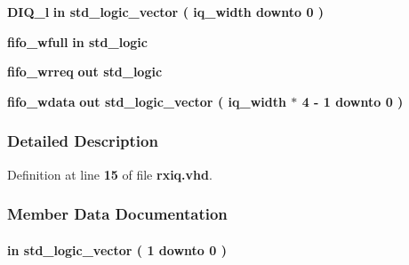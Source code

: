 \begin{DoxyCompactItemize}
{\bf D\+I\+Q\+\_\+l}  {\bfseries {\bfseries \textcolor{keywordflow}{in}\textcolor{vhdlchar}{ }}} {\bfseries \textcolor{comment}{std\+\_\+logic\+\_\+vector}\textcolor{vhdlchar}{ }\textcolor{vhdlchar}{(}\textcolor{vhdlchar}{ }\textcolor{vhdlchar}{ }\textcolor{vhdlchar}{ }\textcolor{vhdlchar}{ }{\bfseries {\bf iq\+\_\+width}} \textcolor{vhdlchar}{ }\textcolor{keywordflow}{downto}\textcolor{vhdlchar}{ }\textcolor{vhdlchar}{ } \textcolor{vhdldigit}{0} \textcolor{vhdlchar}{ }\textcolor{vhdlchar}{)}\textcolor{vhdlchar}{ }} 
\item 
{\bf fifo\+\_\+wfull}  {\bfseries {\bfseries \textcolor{keywordflow}{in}\textcolor{vhdlchar}{ }}} {\bfseries \textcolor{comment}{std\+\_\+logic}\textcolor{vhdlchar}{ }} 
\item 
{\bf fifo\+\_\+wrreq}  {\bfseries {\bfseries \textcolor{keywordflow}{out}\textcolor{vhdlchar}{ }}} {\bfseries \textcolor{comment}{std\+\_\+logic}\textcolor{vhdlchar}{ }} 
\item 
{\bf fifo\+\_\+wdata}  {\bfseries {\bfseries \textcolor{keywordflow}{out}\textcolor{vhdlchar}{ }}} {\bfseries \textcolor{comment}{std\+\_\+logic\+\_\+vector}\textcolor{vhdlchar}{ }\textcolor{vhdlchar}{(}\textcolor{vhdlchar}{ }\textcolor{vhdlchar}{ }\textcolor{vhdlchar}{ }\textcolor{vhdlchar}{ }{\bfseries {\bf iq\+\_\+width}} \textcolor{vhdlchar}{$\ast$}\textcolor{vhdlchar}{ } \textcolor{vhdldigit}{4} \textcolor{vhdlchar}{-\/}\textcolor{vhdlchar}{ } \textcolor{vhdldigit}{1} \textcolor{vhdlchar}{ }\textcolor{keywordflow}{downto}\textcolor{vhdlchar}{ }\textcolor{vhdlchar}{ } \textcolor{vhdldigit}{0} \textcolor{vhdlchar}{ }\textcolor{vhdlchar}{)}\textcolor{vhdlchar}{ }} 
\end{DoxyCompactItemize}


\subsubsection{Detailed Description}


Definition at line {\bf 15} of file {\bf rxiq.\+vhd}.



\subsubsection{Member Data Documentation}
\paragraph[{ch\+\_\+en}]{ {\bfseries \textcolor{keywordflow}{in}\textcolor{vhdlchar}{ }} {\bfseries \textcolor{comment}{std\+\_\+logic\+\_\+vector}\textcolor{vhdlchar}{ }\textcolor{vhdlchar}{(}\textcolor{vhdlchar}{ }\textcolor{vhdlchar}{ } \textcolor{vhdldigit}{1} \textcolor{vhdlchar}{ }\textcolor{keywordflow}{downto}\textcolor{vhdlchar}{ }\textcolor{vhdlchar}{ } \textcolor{vhdldigit}{0} \textcolor{vhdlchar}{ }\textcolor{vhdlchar}{)}\textcolor{vhdlchar}{ }} \hspace{0.3cm}{\ttfamily [Port]}}\label{classrxiq_a6494f316f504075c4ccf47146756d576}


